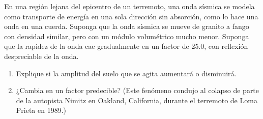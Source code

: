 \item En una región lejana del epicentro de un terremoto, una onda sísmica se modela como transporte de energía en una sola dirección sin absorción, como lo hace una onda en una cuerda. Suponga que la onda sísmica se mueve de granito a fango con densidad similar, pero con un módulo volumétrico mucho menor. Suponga que la rapidez de la onda cae gradualmente en un factor de 25.0, con reflexión despreciable de la onda.
\begin{enumerate}
    \item Explique si la amplitud del suelo que se agita aumentará o disminuirá.
    \item ¿Cambia en un factor predecible? (Este fenómeno condujo al colapso de parte de la autopista Nimitz en Oakland, California, durante el terremoto de Loma Prieta en 1989.)
\end{enumerate}